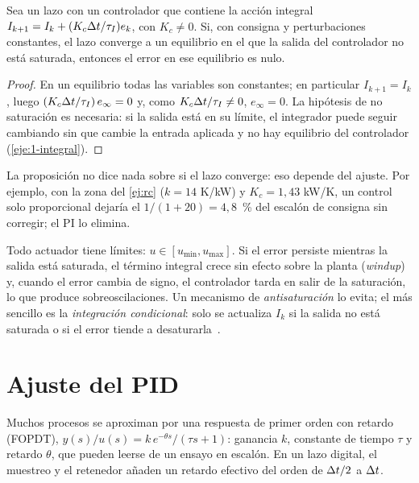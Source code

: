 \begin{proposicion}\label{prop:integral}
Sea un lazo con un controlador que contiene la acción integral $I_{k+1}=I_k+(K_c\Delta t/\tau_I)e_k$, con $K_c\ne0$. Si, con consigna y perturbaciones constantes, el lazo converge a un equilibrio en el que la salida del controlador no está saturada, entonces el error en ese equilibrio es nulo.
\end{proposicion}

\begin{proof}
En un equilibrio todas las variables son constantes; en particular $I_{k+1}=I_k$, luego $(K_c\Delta t/\tau_I)\,e_\infty=0$ y, como $K_c\Delta t/\tau_I\ne0$, $e_\infty=0$. La hipótesis de no saturación es necesaria: si la salida está en su límite, el integrador puede seguir cambiando sin que cambie la entrada aplicada y no hay equilibrio del controlador (\cref{eje:1-integral}).
\end{proof}

La proposición no dice nada sobre si el lazo converge: eso depende del ajuste. Por ejemplo, con la zona del \cref{ej:rc} ($k=14$ K/kW) y $K_c=1{,}43$ kW/K, un control solo proporcional dejaría el $1/(1+20)=4{,}8$~\% del escalón de consigna sin corregir; el PI lo elimina.

\begin{definicion}\label{def:windup}
Todo actuador tiene límites: $u\in[u_{\min},u_{\max}]$. Si el error persiste mientras la salida está saturada, el término integral crece sin efecto sobre la planta (\emph{windup}) y, cuando el error cambia de signo, el controlador tarda en salir de la saturación, lo que produce sobreoscilaciones. Un mecanismo de \emph{antisaturación} lo evita; el más sencillo es la \emph{integración condicional}: solo se actualiza $I_k$ si la salida no está saturada o si el error tiende a desaturarla~\cite[cap.~11]{am}.
\end{definicion}

\section{Ajuste del PID}

\begin{definicion}\label{def:fopdt}
Muchos procesos se aproximan por una respuesta de primer orden con retardo (FOPDT), $y(s)/u(s)=k\,e^{-\theta s}/(\tau s+1)$: ganancia $k$, constante de tiempo $\tau$ y retardo $\theta$, que pueden leerse de un ensayo en escalón. En un lazo digital, el muestreo y el retenedor añaden un retardo efectivo del orden de $\Delta t/2$ a $\Delta t$.
\end{definicion}

